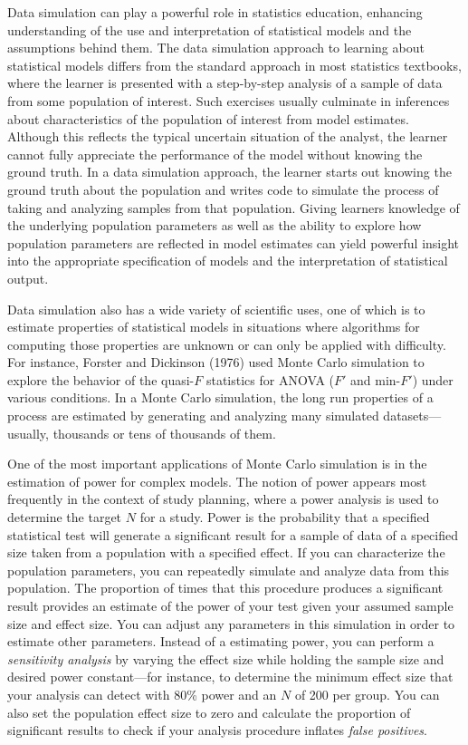\documentclass[english,doc,floatsintext]{apa6}
\begin{document}
Data simulation can play a powerful role in statistics education, enhancing understanding of the use and interpretation of statistical models and the assumptions behind them. The data simulation approach to learning about statistical models differs from the standard approach in most statistics textbooks, where the learner is presented with a step-by-step analysis of a sample of data from some population of interest. Such exercises usually culminate in inferences about characteristics of the population of interest from model estimates. Although this reflects the typical uncertain situation of the analyst, the learner cannot fully appreciate the performance of the model without knowing the ground truth. In a data simulation approach, the learner starts out knowing the ground truth about the population and writes code to simulate the process of taking and analyzing samples from that population. Giving learners knowledge of the underlying population parameters as well as the ability to explore how population parameters are reflected in model estimates can yield powerful insight into the appropriate specification of models and the interpretation of statistical output.

Data simulation also has a wide variety of scientific uses, one of which is to estimate properties of statistical models in situations where algorithms for computing those properties are unknown or can only be applied with difficulty. For instance, Forster and Dickinson (1976) used Monte Carlo simulation to explore the behavior of the quasi-\(F\) statistics for ANOVA (\(F'\) and min-\(F'\)) under various conditions. In a Monte Carlo simulation, the long run properties of a process are estimated by generating and analyzing many simulated datasets---usually, thousands or tens of thousands of them.

One of the most important applications of Monte Carlo simulation is in the estimation of power for complex models. The notion of power appears most frequently in the context of study planning, where a power analysis is used to determine the target \(N\) for a study. Power is the probability that a specified statistical test will generate a significant result for a sample of data of a specified size taken from a population with a specified effect. If you can characterize the population parameters, you can repeatedly simulate and analyze data from this population. The proportion of times that this procedure produces a significant result provides an estimate of the power of your test given your assumed sample size and effect size. You can adjust any parameters in this simulation in order to estimate other parameters. Instead of a estimating power, you can perform a \emph{sensitivity analysis} by varying the effect size while holding the sample size and desired power constant---for instance, to determine the minimum effect size that your analysis can detect with 80\% power and an \(N\) of 200 per group. You can also set the population effect size to zero and calculate the proportion of significant results to check if your analysis procedure inflates \emph{false positives}.
\end{document}
